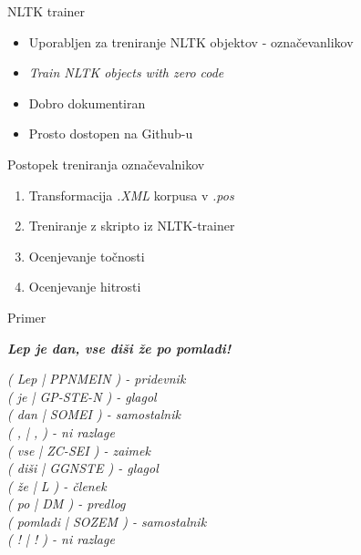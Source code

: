 \documentclass{beamer}
\begin{document}
\begin{frame}{NLTK trainer}
\begin{itemize}
\item Uporabljen za treniranje NLTK objektov - označevanlikov
\item \textit{Train NLTK objects with zero code}
\item Dobro dokumentiran
\item Prosto dostopen na Github-u
\end{itemize}
\end{frame}

\begin{frame}{Postopek treniranja označevalnikov}
\begin{enumerate}
\item Transformacija \textit{.XML} korpusa v \textit{.pos}
\item Treniranje z skripto iz NLTK-trainer
\item Ocenjevanje točnosti
\item Ocenjevanje hitrosti
\end{enumerate}
\end{frame}

\begin{frame}{Primer}
\begin{center}
\textit{\textbf{Lep je dan, vse diši že po pomladi!}}
\end{center}
\textit{( Lep  |  PPNMEIN ) - pridevnik\\
	( je  |  GP-STE-N ) - glagol\\
	( dan  |  SOMEI ) - samostalnik\\
	( ,  |  , ) - ni razlage\\
	( vse  |  ZC-SEI ) - zaimek\\
	( diši  |  GGNSTE ) - glagol\\
	( že  |  L ) - členek\\
	( po  |  DM ) - predlog\\
	( pomladi  |  SOZEM ) - samostalnik\\
	( !  |  ! ) - ni razlage}\\
\end{frame}
\end{document}
